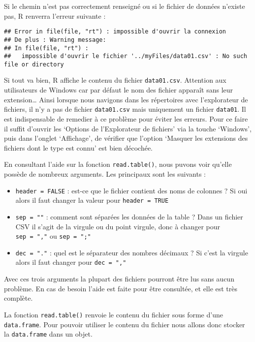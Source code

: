 \documentclass[]{book}
\providecommand{\tightlist}{%
  \setlength{\itemsep}{0pt}\setlength{\parskip}{0pt}}
\theoremstyle{definition}
\theoremstyle{definition}
\theoremstyle{definition}
\theoremstyle{remark}
\begin{document}
Si le chemin n'est pas correctement renseigné ou si le fichier de
données n'existe pas, R renverra l'erreur suivante :

\begin{verbatim}
## Error in file(file, "rt") : impossible d'ouvrir la connexion
## De plus : Warning message:
## In file(file, "rt") :
##   impossible d'ouvrir le fichier '../myFiles/data01.csv' : No such file or directory
\end{verbatim}

Si tout va bien, R affiche le contenu du fichier \texttt{data01.csv}.
Attention aux utilisateurs de Windows car par défaut le nom des fichier
apparaît sans leur extension\ldots{} Ainsi lorsque nous navigons dans
les répertoires avec l'explorateur de fichiers, il n'y a pas de fichier
\texttt{data01.csv} mais uniquement un fichier \texttt{data01}. Il est
indispensable de remedier à ce problème pour éviter les erreurs. Pour ce
faire il suffit d'ouvrir les `Options de l'Explorateur de fichiers' via
la touche `Windows', puis dans l'onglet `Affichage', de vérifier que
l'option `Masquer les extensions des fichiers dont le type est connu'
est bien décochée.

En consultant l'aide sur la fonction \texttt{read.table()}, nous puvons
voir qu'elle possède de nombreux arguments. Les principaux sont les
suivants :

\begin{itemize}
\tightlist
\item
  \texttt{header\ =\ FALSE} : est-ce que le fichier contient des noms de
  colonnes ? Si oui alors il faut changer la valeur pour
  \texttt{header\ =\ TRUE}
\item
  \texttt{sep\ =\ ""} : comment sont séparées les données de la table ?
  Dans un fichier CSV il s'agit de la virgule ou du point virgule, donc
  à changer pour \texttt{sep\ =\ ","} ou \texttt{sep\ =\ ";"}
\item
  \texttt{dec\ =\ "."} : quel est le séparateur des nombres décimaux ?
  Si c'est la virgule alors il faut changer pour \texttt{dec\ =\ ","}
\end{itemize}

Avec ces trois arguments la plupart des fichiers pourront être lus sans
aucun problème. En cas de besoin l'aide est faite pour être consultée,
et elle est très complète.

La fonction \texttt{read.table()} renvoie le contenu du fichier sous
forme d'une \texttt{data.frame}. Pour pouvoir utiliser le contenu du
fichier nous allons donc stocker la \texttt{data.frame} dans un objet.
\end{document}

